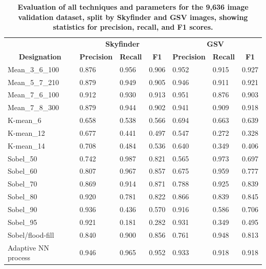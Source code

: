 \documentclass[final,3p,times,authoryear]{elsarticle}
\begin{document}
\begin{table}[!htbp]
\caption{\bf Evaluation of all techniques and parameters for the 9,636 image validation dataset, split by Skyfinder and GSV images, showing statistics for precision, recall, and F1 scores. \label{tab:precision}}     
\begin{tabular}{ l l l l l l l }
\multicolumn{1}{c}{\textbf{~}}
& \multicolumn{3}{c}{\textbf{Skyfinder}}
& \multicolumn{3}{c}{\textbf{GSV}}
\\ 
 \multicolumn{1}{c|}{\textbf{Designation}}
& \textbf{Precision} 
& \textbf{Recall} 
& \multicolumn{1}{c|}{\textbf{F1}}
& \textbf{Precision} 
& \textbf{Recall}  
& \multicolumn{1}{c|}{\textbf{F1}}
\\ \hline
Mean\_3\_6\_100	&0.876&0.956&0.906&0.952&0.915&0.927\\
Mean\_5\_7\_210	&0.879&0.949&0.905&0.946&0.911&0.921\\
Mean\_7\_6\_100	&0.912&0.930&0.913&0.951&0.876&0.903\\
Mean\_7\_8\_300 &0.879&0.944&0.902&0.941&0.909&0.918\\
K-mean\_6       &0.658&0.538&0.566&0.694&0.663&0.639\\
K-mean\_12      &0.677&0.441&0.497&0.547&0.272&0.328\\
K-mean\_14      &0.708&0.484&0.536&0.640&0.349&0.406\\
Sobel\_50       &0.742&0.987&0.821&0.565&0.973&0.697\\
Sobel\_60       &0.807&0.967&0.857&0.675&0.959&0.777\\
Sobel\_70       &0.869&0.914&0.871&0.788&0.925&0.839\\
Sobel\_80       &0.920&0.781&0.822&0.866&0.839&0.845\\
Sobel\_90       &0.936&0.436&0.570&0.916&0.586&0.706\\
Sobel\_95       &0.921&0.181&0.282&0.931&0.349&0.495\\
\hline
Sobel/flood-fill&0.840&0.900&0.856&0.761&0.948&0.813 \\
\hline
Adaptive NN process&0.946&0.965&0.952&0.933&0.918&0.918 \\
\hline
\end{tabular}
\end{table}
\end{document}

